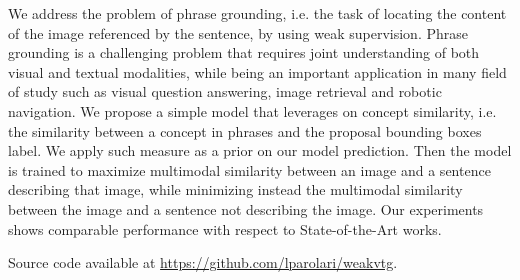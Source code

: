
We address the problem of phrase grounding, i.e. the task of locating
the content of the image referenced by the sentence, by using weak
supervision. Phrase grounding is a challenging problem that requires
joint understanding of both visual and textual modalities, while being
an important application in many field of study such as visual
question answering, image retrieval and robotic navigation. We propose
a simple model that leverages on concept similarity, i.e. the
similarity between a concept in phrases and the proposal bounding
boxes label. We apply such measure as a prior on our model prediction.
Then the model is trained to maximize multimodal similarity between an
image and a sentence describing that image, while minimizing instead
the multimodal similarity between the image and a sentence not
describing the image. Our experiments shows comparable performance
with respect to State-of-the-Art works.

Source code available at
\href{https://github.com/lparolari/weakvtg}{https://github.com/lparolari/weakvtg}.